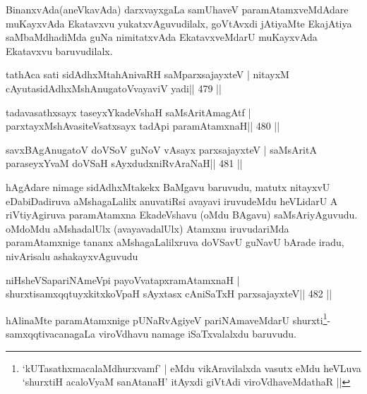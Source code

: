 \begin{artha}
BinanxvAda(aneVkavAda) darxvayxgaLa samUhaveV paramAtamxveMdAdare muKayxvAda Ekatavxvu yukatxvAguvudilalx, goVtAvxdi jAtiyaMte EkajAtiya saMbaMdhadiMda guNa nimitatxvAda EkatavxveMdarU muKayxvAda Ekatavxvu baruvudilalx.
\end{artha}



\begin{shl}
tathAca sati sidAdhxMtahAnivaRH saMparxsajayxteV |
nitayxM cAyutasidAdhxMshAnugatoV\s vayaviV yadi\hfill || 479 ||
\end{shl}

\begin{shl}
tadavasathxsayx taseyxYkadeVshaH saMsAritAmagAtf |
parxtayxMshAvasiteVsatxsayx tadA\s pi paramAtamxnaH\hfill || 480 ||
\end{shl}

\begin{shl}
savxBAgAnugatoV doVSoV guNoV vA\s sayx parxsajayxteV |
saMsAritA paraseyxYvaM doVSaH sAyxdudxniRvAraNaH\hfill || 481 ||
\end{shl}

\begin{artha}
hAgAdare nimage sidAdhxMtakekx BaMgavu baruvudu, matutx nitayxvU
eDabiDadiruva aMshagaLalilx anuvatiRsi avayavi iruvudeMdu heVLidarU A
riVtiyAgiruva paramAtamxna EkadeVshavu (oMdu BAgavu) saMsAriyAguvudu.
oMdoMdu aMshadalUlx (avayavadalUlx) Atamxnu iruvudariMda
paramAtamxnige tananx aMshagaLalilxruva doVSavU guNavU bArade iradu,
nivArisalu ashakayxvAguvudu
\end{artha}


\begin{shl}
niHsheVSapariNAmeV\s pi payoVvatapxramAtamxnaH |
shurxtisamxqqtuyxkitxkoVpaH sAyxtasx cAniSaTxH parxsajayxteV\hfill || 482 ||
\end{shl}

\begin{artha}
hAlinaMte paramAtamxnige pUNaRvAgiyeV pariNAmaveMdarU shurxti\footnote[1]{`kUTasathxmacalaMdhurxvamf' | eMdu vikAravilalxda   vasutx eMdu heVLuva `shurxtiH acaloV\s yaM sanAtanaH' itAyxdi giVtAdi viroVdhaveMdathaR ||}-samxqqtivacanagaLa viroVdhavu namage iSaTxvalalxdu baruvudu.
\end{artha}



